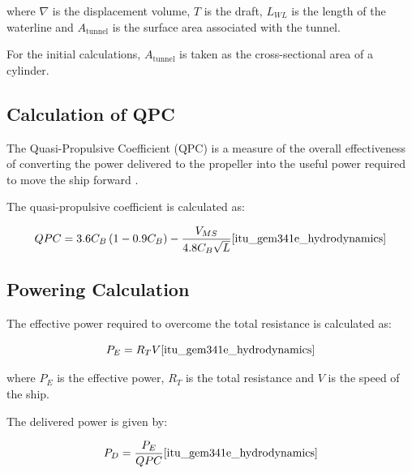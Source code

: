 \documentclass[12pt,a4paper,twoside]{report}
\begin{document}
\vspace{\baselineskip} \par \noindent where $\nabla$ is the displacement volume, $T$ is the draft,
$L_{WL}$ is the length of the waterline and $A_{\mathrm{tunnel}}$ is the
surface area associated with the tunnel.

\vspace{\baselineskip} \par \noindent For the initial calculations, $A_{\mathrm{tunnel}}$ is taken as the
cross-sectional area of a cylinder.
\subsection{Calculation of QPC}

The Quasi-Propulsive Coefficient (QPC) is a measure of the overall
effectiveness of converting the power delivered to the propeller into
the useful power required to move the ship forward
\cite{itu_gem341e_hydrodynamics}.

\vspace{\baselineskip} \par \noindent The quasi-propulsive coefficient is calculated as:

\begin{equation}
QPC =
3.6C_B
\left(1-0.9C_B\right)
-
\frac{V_{MS}}{4.8C_B\sqrt{L}}
\cite{itu_gem341e_hydrodynamics}
\end{equation}

\subsection{Powering Calculation}

The effective power required to overcome the total resistance is
calculated as:

\begin{equation}
P_E=R_TV
\cite{itu_gem341e_hydrodynamics}
\end{equation}

\vspace{\baselineskip} \par \noindent where $P_E$ is the effective power, $R_T$ is the total resistance 
and $V$ is the speed of the ship.

\vspace{\baselineskip} \par \noindent The delivered power is given by:

\begin{equation}
P_D=\frac{P_E}{QPC}
\cite{itu_gem341e_hydrodynamics}
\end{equation}
\end{document}

